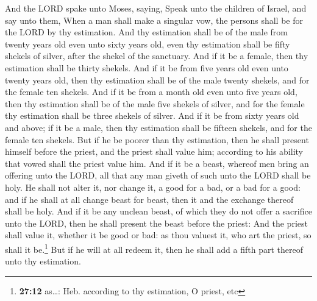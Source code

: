  And the LORD spake unto Moses, saying, 
Speak unto the children of Israel, and say unto them, When a man shall
make a singular vow, the persons shall be for the LORD by thy
estimation.  And thy estimation shall be of the male from
twenty years old even unto sixty years old, even thy estimation shall be
fifty shekels of silver, after the shekel of the sanctuary.
 And if it be a female, then thy estimation shall be
thirty shekels.  And if it be from five years old even
unto twenty years old, then thy estimation shall be of the male twenty
shekels, and for the female ten shekels.  And if it be
from a month old even unto five years old, then thy estimation shall be
of the male five shekels of silver, and for the female thy estimation
shall be three shekels of silver.  And if it be from sixty
years old and above; if it be a male, then thy estimation shall be
fifteen shekels, and for the female ten shekels.  But if
he be poorer than thy estimation, then he shall present himself before
the priest, and the priest shall value him; according to his ability
that vowed shall the priest value him.  And if it be a
beast, whereof men bring an offering unto the LORD, all that any man
giveth of such unto the LORD shall be holy.  He shall not
alter it, nor change it, a good for a bad, or a bad for a good: and if
he shall at all change beast for beast, then it and the exchange thereof
shall be holy.  And if it be any unclean beast, of which
they do not offer a sacrifice unto the LORD, then he shall present the
beast before the priest:  And the priest shall value it,
whether it be good or bad: as thou valuest it, who art the priest, so
shall it be.\footnote{\textbf{27:12} as\ldots: Heb. according to thy
  estimation, O priest, etc}  But if he will at all
redeem it, then he shall add a fifth part thereof unto thy estimation.

